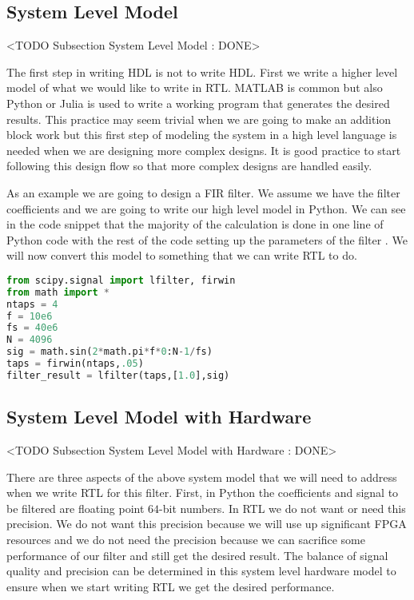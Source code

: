 \subsection{System Level Model}
	<TODO Subsection System Level Model : DONE>

The first step in writing \ac{HDL} is not to write \ac{HDL}. First we write a higher level model of what we would like to write in \ac{RTL}. MATLAB is common but also Python or Julia is used to write a working program that generates the desired results. This practice may seem trivial when we are going to make an addition block work but this first step of modeling the system in a high level language is needed when we are designing more complex designs. It is good practice to start following this design flow so that more complex designs are handled easily.

As an example we are going to design a \ac{FIR} filter. We assume we have the filter coefficients and we are going to write our high level model in Python. We can see in the code snippet that the majority of the calculation is done in one line of Python code with the rest of the code setting up the parameters of the filter \cite{scipyref}. We will now convert this model to something that we can write \ac{RTL} to do.

\begin{lstlisting}[language=Python]
from scipy.signal import lfilter, firwin
from math import *
ntaps = 4
f = 10e6
fs = 40e6
N = 4096
sig = math.sin(2*math.pi*f*0:N-1/fs)
taps = firwin(ntaps,.05)
filter_result = lfilter(taps,[1.0],sig)
\end{lstlisting}
	
\subsection{System Level Model with Hardware}
	<TODO Subsection System Level Model with Hardware : DONE>

There are three aspects of the above system model that we will need to address when we write \ac{RTL} for this filter. First, in Python the coefficients and signal to be filtered are floating point $64$-bit numbers. In \ac{RTL} we do not want or need this precision. We do not want this precision because we will use up significant \ac{FPGA} resources and we do not need the precision because we can sacrifice some performance of our filter and still get the desired result. The balance of signal quality and precision can be determined in this system level hardware model to ensure when we start writing \ac{RTL} we get the desired performance.

